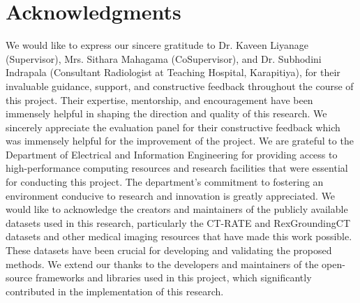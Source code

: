 
\chapter*{Acknowledgments}
We would like to express our sincere gratitude to Dr. Kaveen Liyanage (Supervisor), Mrs. Sithara Mahagama (CoSupervisor),
and Dr. Subhodini Indrapala (Consultant Radiologist at Teaching Hospital, Karapitiya), for their invaluable guidance, support,
and constructive feedback throughout the course of this project. Their expertise,
mentorship, and encouragement have been immensely helpful in shaping the direction and quality of this research.
We sincerely appreciate the evaluation panel for their constructive feedback which was immensely helpful for the improvement of the project.
We are grateful to the Department of Electrical and Information Engineering for
providing access to high-performance computing resources and research facilities that were essential for
conducting this project. The department's commitment to fostering an environment conducive to research and innovation is greatly appreciated.
We would like to acknowledge the creators and maintainers of the publicly available datasets used in this research,
particularly the CT-RATE and RexGroundingCT datasets and other medical imaging resources that have made this work possible.
These datasets have been crucial for developing and validating the proposed methods.
We extend our thanks to the developers and maintainers of the open-source frameworks and libraries used in this project,
which significantly contributed in the implementation of this research.
